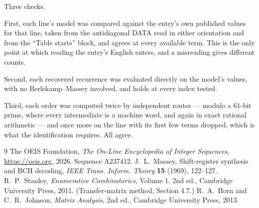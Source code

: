\documentclass[11pt,a4paper]{article}
\theoremstyle{plain}
\theoremstyle{definition}
\begin{document}
Three checks.

First, each line's model was compared against the entry's own published values for that line,
taken from the antidiagonal DATA read in either orientation and from the ``Table starts''
block, and agrees at every available term. This is the only point at which reading the entry's
English enters, and a misreading gives different counts.

Second, each recovered recurrence was evaluated directly on the model's values, with no
Berlekamp--Massey involved, and holds at every index tested.

Third, each order was computed twice by independent routes --- modulo a $61$-bit prime, where
every intermediate is a machine word, and again in exact rational arithmetic --- and once more
on the line with its first few terms dropped, which is what the identification requires. All
agree.

\begin{thebibliography}{9}
 The OEIS Foundation, \emph{The On-Line Encyclopedia of Integer
Sequences}, \url{https://oeis.org}, 2026. Sequence A237412.
 J.~L.~Massey, Shift-register synthesis and BCH decoding, \emph{IEEE
Trans. Inform. Theory} \textbf{15} (1969), 122--127.
 R.~P.~Stanley, \emph{Enumerative Combinatorics}, Volume 1, 2nd ed.,
Cambridge University Press, 2011. (Transfer-matrix method, Section 4.7.)
 R.~A.~Horn and C.~R.~Johnson, \emph{Matrix Analysis}, 2nd ed., Cambridge
University Press, 2013.
\end{thebibliography}
\end{document}
